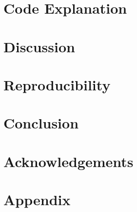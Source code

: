 \documentclass[11pt]{article}
\begin{document}
\section{Code Explanation}


\section{Discussion}


\section{Reproducibility}


\section{Conclusion}


\clearpage
\section*{Acknowledgements}


\clearpage
\appendix
\section{Appendix}


\clearpage


\end{document}
